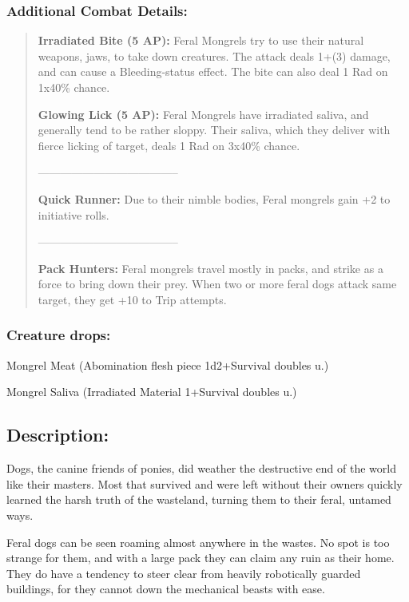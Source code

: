 \documentclass[11pt,a4paper,twocolumn]{book}
\begin{document}
	\subsubsection*{Additional Combat Details:}
	\begin{verse}
		\textbf{Irradiated Bite (5 AP):} Feral Mongrels try to use their natural weapons, jaws, to take down creatures. The attack deals 1+(3) damage, and can cause a Bleeding-status effect. The bite can also deal 1 Rad on 1x40\% chance.
		
		\textbf{Glowing Lick (5 AP):} Feral Mongrels have irradiated saliva, and generally tend to be rather sloppy. Their saliva, which they deliver with fierce licking of target, deals 1 Rad on 3x40\% chance.
		
		--------------------------------------
		
		\textbf{Quick Runner:} Due to their nimble bodies, Feral mongrels gain +2 to initiative rolls.
		
		--------------------------------------
		
		\textbf{Pack Hunters:} Feral mongrels travel mostly in packs, and strike as a force to bring down their prey. When two or more feral dogs attack same target, they get +10 to Trip attempts.
		
	\end{verse}
	
	\subsubsection*{Creature drops:}
	\begin{compactitem}
		\item Mongrel Meat (Abomination flesh piece 1d2+Survival doubles u.)
		\item Mongrel Saliva (Irradiated Material 1+Survival doubles u.)
	\end{compactitem}
	
	\subsection*{Description:}
	Dogs, the canine friends of ponies, did weather the destructive end of the world like their masters. Most that survived and were left without their owners quickly learned the harsh truth of the wasteland, turning them to their feral, untamed ways. 
	
	Feral dogs can be seen roaming almost anywhere in the wastes. No spot is too strange for them, and with a large pack they can claim any ruin as their home. They do have a tendency to steer clear from heavily robotically guarded buildings, for they cannot down the mechanical beasts with ease.
	
\end{document}
